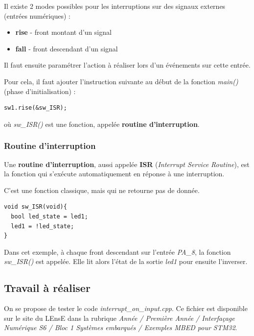 \documentclass[a4paper,11pt,titlepage]{article} %
\begin{document}
\medskip

Il existe 2 modes possibles pour les interruptions sur des signaux externes (entrées numériques) : 

\begin{itemize}
	\item \textbf{rise} - front montant d'un signal
	\item \textbf{fall} - front descendant d'un signal
\end{itemize}

\medskip

Il faut ensuite paramétrer l'action à réaliser lors d'un événements sur cette entrée.

Pour cela, il faut ajouter l'instruction suivante au début de la fonction \textsl{main()} (phase d'initialisation) :

\begin{lstlisting}
sw1.rise(&sw_ISR);
\end{lstlisting}

où \textsl{sw\_ISR()} est une fonction, appelée \textbf{routine d'interruption}.

\subsubsection{Routine d'interruption}

Une \textbf{routine d'interruption}, aussi appelée \textbf{ISR} (\textit{Interrupt Service Routine}), est la fonction qui s'exécute automatiquement en réponse à une interruption. 

C'est une fonction classique, mais qui ne retourne pas de donnée.

\begin{lstlisting}
void sw_ISR(void){
  bool led_state = led1;
  led1 = !led_state;
} 
\end{lstlisting}

Dans cet exemple, à chaque front descendant sur l'entrée \textsl{PA\_8}, la fonction \textsl{sw\_ISR()} est appelée. Elle lit alors l'état de la sortie \textsl{led1} pour ensuite l'inverser.

\newpage
\subsection{Travail à réaliser}

On se propose de tester le code \textsl{interrupt\_on\_input.cpp}. Ce fichier est disponible sur le site du LEnsE dans la rubrique \textit{Année / Première Année / Interfaçage Numérique S6 / Bloc 1 Systèmes embarqués / Exemples MBED pour STM32}.
\end{document}
